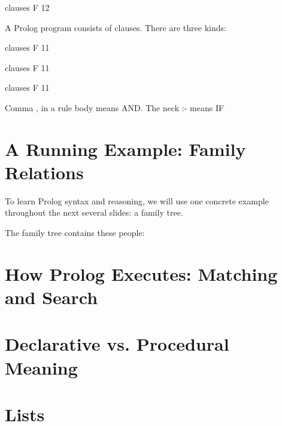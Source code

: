 
\begin{bsp}
    clauses F 12 %
\end{bsp}




A Prolog program consists of clauses. There are three kinds:

\begin{bsp}
    clauses F 11 %
\end{bsp}


\begin{bsp}
    clauses F 11 %
\end{bsp}


\begin{bsp}
    clauses F 11 %
\end{bsp}

\begin{notation}
    Comma , in a rule body means AND. The neck :- means IF
\end{notation}


\section{A Running Example: Family Relations}
To learn Prolog syntax and reasoning, we will use one concrete example throughout the
next several slides: a family tree.

The family tree contains these people: %




\section{How Prolog Executes: Matching and Search}

\section{Declarative vs. Procedural Meaning}

\section{Lists}

